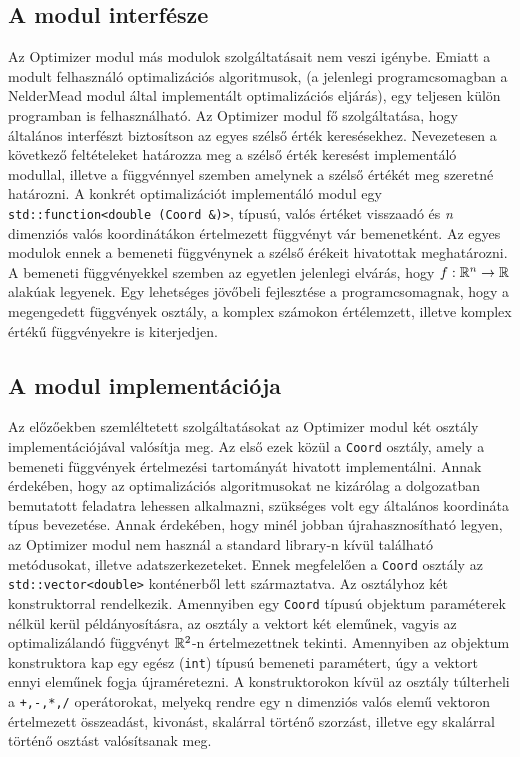 \documentclass[oneside,titlepage,12pt,a4paper]{report}
\begin{document}
\subsection*{A modul interfésze}

\par Az Optimizer modul más modulok szolgáltatásait nem veszi igénybe. Emiatt a modult felhasználó optimalizációs algoritmusok, (a jelenlegi programcsomagban a NelderMead modul által implementált optimalizációs eljárás), egy teljesen külön programban is felhasználható. Az Optimizer modul fő szolgáltatása, hogy általános interfészt biztosítson az egyes szélső érték keresésekhez. Nevezetesen a következő feltételeket határozza meg a szélső érték keresést implementáló modullal, illetve a függvénnyel szemben amelynek a szélső értékét meg szeretné határozni. A konkrét optimalizációt implementáló modul egy \texttt{std::function<double (Coord \&)>}, típusú, valós értéket visszaadó és \textit{n} dimenziós valós koordinátákon értelmezett függvényt vár bemenetként. Az egyes modulok ennek a bemeneti függvénynek a szélső érékeit hivatottak meghatározni. A bemeneti függvényekkel szemben az egyetlen jelenlegi elvárás, hogy $f : \Bbb R^n \to \Bbb R$ alakúak legyenek. Egy lehetséges jövőbeli fejlesztése a programcsomagnak, hogy a megengedett függvények osztály, a komplex számokon értélemzett, illetve komplex értékű függvényekre is kiterjedjen.

\subsection*{A modul implementációja}

\par Az előzőekben szemléltetett szolgáltatásokat az Optimizer modul két osztály implementációjával valósítja meg. Az első ezek közül a \texttt{Coord} osztály, amely a bemeneti függvények értelmezési tartományát hivatott implementálni. Annak érdekében, hogy az optimalizációs algoritmusokat ne kizárólag a dolgozatban bemutatott feladatra lehessen alkalmazni, szükséges volt egy általános koordináta típus bevezetése. Annak érdekében, hogy minél jobban újrahasznosítható legyen, az Optimizer modul nem használ a standard library-n kívül található metódusokat, illetve adatszerkezeteket. Ennek megfelelően a \texttt{Coord} osztály az \texttt{std::vector<double>} konténerből lett származtatva. Az osztályhoz két konstruktorral rendelkezik. Amennyiben egy \texttt{Coord} típusú objektum paraméterek nélkül kerül példányosításra, az osztály a vektort két eleműnek, vagyis az optimalizálandó függvényt $ \Bbb R^2 $-n értelmezettnek tekinti. Amennyiben az objektum konstruktora kap egy egész (\texttt{int}) típusú bemeneti paramétert, úgy a vektort ennyi eleműnek fogja újraméretezni. A konstruktorokon kívül az osztály túlterheli a \texttt{+,-,*,/} operátorokat, melyekq rendre egy n dimenziós valós elemű vektoron értelmezett összeadást, kivonást, skalárral történő szorzást, illetve egy skalárral történő osztást valósítsanak meg.       
\end{document}
